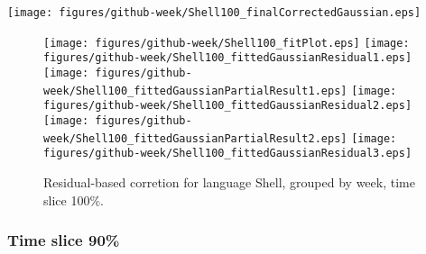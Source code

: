 \begin{center}
{\texttt{[image: figures/github-week/Shell100\_finalCorrectedGaussian.eps]}}
\end{center}

\FloatBarrier

\begin{figure}[t]
\centering
{}
{\texttt{[image: figures/github-week/Shell100\_fitPlot.eps]}}
{\texttt{[image: figures/github-week/Shell100\_fittedGaussianResidual1.eps]}}
{\texttt{[image: figures/github-week/Shell100\_fittedGaussianPartialResult1.eps]}}
{\texttt{[image: figures/github-week/Shell100\_fittedGaussianResidual2.eps]}}
{\texttt{[image: figures/github-week/Shell100\_fittedGaussianPartialResult2.eps]}}
{\texttt{[image: figures/github-week/Shell100\_fittedGaussianResidual3.eps]}}
\caption{Residual-based corretion for language Shell, grouped by week, time slice 100\%.}
\end{figure}


\FloatBarrier


\subsubsection{Time slice 90\%}

